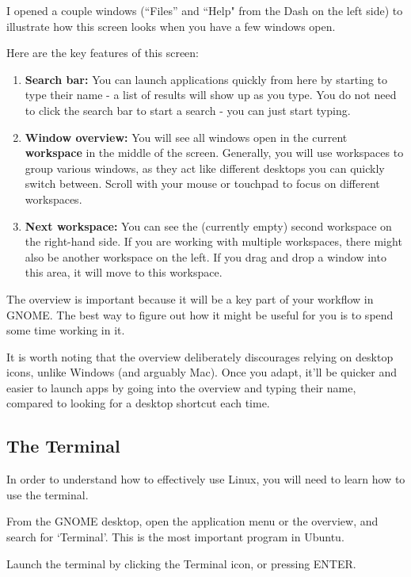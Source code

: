 \documentclass[12pt]{article}
\begin{document}
I opened a couple windows (``Files'' and ``Help" from the Dash on the left side) to illustrate how this screen looks when you have a few windows open.

Here are the key features of this screen:

\begin{enumerate}
    \item \textbf{Search bar:} You can launch applications quickly from here by starting to type their name - a list of results will show up as you type. You do not need to click the search bar to start a search - you can just start typing.
    \item \textbf{Window overview:} You will see all windows open in the current \textbf{workspace} in the middle of the screen. Generally, you will use workspaces to group various windows, as they act like different desktops you can quickly switch between. Scroll with your mouse or touchpad to focus on different workspaces.
    \item \textbf{Next workspace:} You can see the (currently empty) second workspace on the right-hand side. If you are working with multiple workspaces, there might also be another workspace on the left. If you drag and drop a window into this area, it will move to this workspace.
\end{enumerate}

The overview is important because it will be a key part of your workflow in GNOME. The best way to figure out how it might be useful for you is to spend some time working in it. 

It is worth noting that the overview deliberately discourages relying on desktop icons, unlike Windows (and arguably Mac). Once you adapt, it'll be quicker and easier to launch apps by going into the overview and typing their name, compared to looking for a desktop shortcut each time. 

\pagebreak

\subsection{The Terminal}

In order to understand how to effectively use Linux, you will need to learn how to use the terminal. 

From the GNOME desktop, open the application menu or the overview, and search for `Terminal'. This is the most important program in Ubuntu.

Launch the terminal by clicking the Terminal icon, or pressing ENTER.
\end{document}
